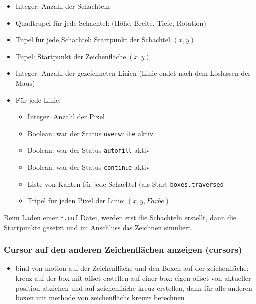 \begin{itemize}
\item Integer: Anzahl der Schachteln
\item Quadtrupel für jede Schachtel: (Höhe, Breite, Tiefe, Rotation)
\item Tupel für jede Schachtel: Startpunkt der Schachtel $(x,y)$
\item Tupel: Startpunkt der Zeichenfläche $(x,y)$
\item Integer: Anzahl der gezeichneten Linien (Linie endet nach dem Loslassen der Maus)
\item Für jede Linie:
  \begin{itemize}
    \item Integer: Anzahl der Pixel
    \item Boolean: war der Status \texttt{overwrite} aktiv
    \item Boolean: war der Status \texttt{autofill} aktiv
    \item Boolean: war der Status \texttt{continue} aktiv
    \item Liste von Kanten für jede Schachtel (als Start \texttt{boxes.traversed}
    \item Tripel für jeden Pixel der Linie: $(x, y, Farbe)$
  \end{itemize}
\end{itemize}

Beim Laden einer \texttt{*.cuf} Datei, werden erst die Schachteln erstellt, dann die Startpunkte gesetzt und im Anschluss das Zeichnen simuliert.

\subsubsection{Cursor auf den anderen Zeichenflächen anzeigen (cursors)}
\label{subsubsec:cursor}

\begin{itemize}
\item bind von motion auf der Zeichenfläche und den Boxen auf der zeichenfläche:
kreuz auf der box mit offset erstellen auf einer box: eigen offset
von aktueller position abziehen und auf zeichenfläche kreuz erstellen,
dann für alle anderen boxen mit methode von zeichenfläche kreuze berechnen
\end{itemize}


